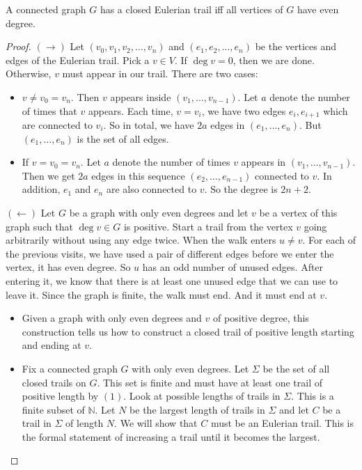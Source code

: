 \documentclass{report}
\begin{document}
\begin{theorem}{}
    A connected graph $G$ has a closed Eulerian trail iff all vertices of $G$ have even degree.
\end{theorem}
    \begin{proof}
        $(\rightarrow )$ Let $(v_{0}, v_{1}, v_{2}, \ldots , v_{n})$ and $(e_{1}, e_{2}, \ldots , e_{n})$ be the vertices and edges of the Eulerian trail. Pick a $v \in V$. If $\mathop{deg}v = 0$, then we are done. Otherwise, $v$ must appear in our trail. There are two cases:
            \begin{itemize}
                \item $v \neq v_{0} = v_{n}$. Then $v$ appears inside $(v_{1}, \ldots , v_{n - 1})$. Let $a$ denote the number of times that $v$ appears. Each time, $v = v_{i}$, we have two edges $e_{i}, e_{i + 1}$ which are connected to $v_{i}$. So in total, we have $2a$ edges in $(e_{1}, \ldots , e_{n})$. But $(e_{1}, \ldots , e_{n})$ is the set of all edges.

                \item If $v = v_{0} = v_{n}$. Let $a$ denote the number of times $v$ appears in $(v_{1}, \ldots , v_{n - 1})$. Then we get $2a$ edges in this sequence $(e_{2}, \ldots , e_{n - 1})$ connected to $v$. In addition, $e_{1}$ and $e_{n}$ are also connected to $v$. So the degree is $2n + 2$.
            \end{itemize}

        $(\leftarrow)$ Let $G$ be a graph with only even degrees and let $v$ be a vertex of this graph such that $\deg v \in G$ is positive. Start a trail from the vertex $v$ going arbitrarily without using any edge twice. When the walk enters $u \neq v$. For each of the previous visits, we have used a pair of different edges before we enter the vertex, it has even degree. So $u$ has an odd number of unused edges. After entering it, we know that there is at least one unused edge that we can use to leave it. Since the graph is finite, the walk must end. And it must end at $v$. 

        \begin{itemize}
            \item Given a graph with only even degrees and $v$ of positive degree, this construction tells us how to construct a closed trail of positive length starting and ending at $v$.

            \item Fix a connected graph $G$ with only even degrees. Let $\Sigma$ be the set of all closed trails on $G$. This set is finite and must have at least one trail of positive length by $(1)$. Look at possible lengths of trails in $\Sigma$. This is a finite subset of $\mathbb{N}$. Let $N$ be the largest length of trails in $\Sigma$ and let $C$ be a trail in $\Sigma$ of length $N$. We will show that $C$ must be an Eulerian trail. This is the formal statement of increasing a trail until it becomes the largest. 


\end{itemize}
\end{proof}
\end{document}
